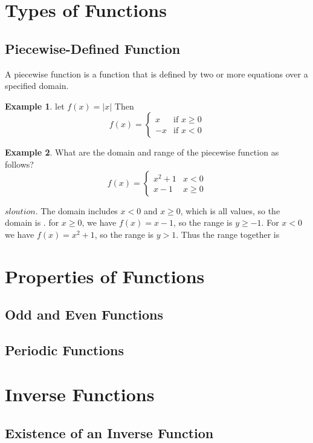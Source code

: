 \documentclass[a4paper]{article}
\theoremstyle{definition}
\newtheorem{exmp}{Example}[section]
\begin{document}
\section{Types of Functions}
\subsection{Piecewise-Defined Function}
A piecewise function is a function that is defined by two or more equations over a
specified domain.

\begin{exmp}
    let \(f(x) = |x|\) Then
    \[ f(x) =
        \begin{cases}
            x  & \text{if } x \ge 0 \\
            -x & \text{if } x < 0
        \end{cases}
    \]

\end{exmp}

\begin{exmp}
    What are the domain and range of the piecewise function as follows?
    \[
        f(x) =
        \begin{cases}
            x^2 + 1 & x < 0   \\
            x - 1   & x \ge 0
        \end{cases}
    \]
\end{exmp}

\(sloution\). The domain includes \(x < 0 \) and \(x \ge 0\),
which is all values, so the domain is
\framebox[\width]{ \((-\infty, \infty)\) }. for \(x \ge 0\), we have \(f(x) = x - 1\),
so the range is \(y \ge -1\). For \(x < 0\) we have \(f(x) = x^2 + 1\), so the range is \(y > 1\).
Thus the range together is \framebox[\width]{ \([-1, \infty )\) }

\section{Properties of Functions}
\subsection{Odd and Even Functions}
\subsection{Periodic Functions}
\section{Inverse Functions}
\subsection{Existence of an Inverse Function}
\end{document}
